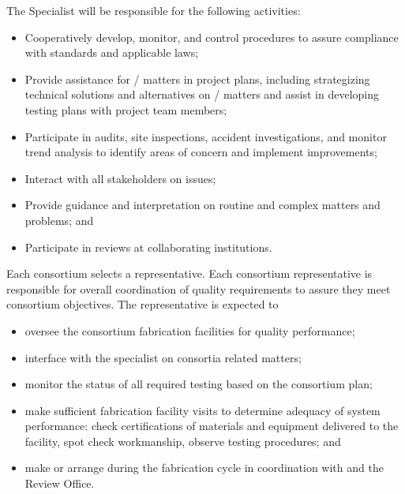 The   Specialist will be responsible for the
following activities:
\begin{itemize}
	\item Cooperatively develop, monitor, and control 
           procedures to assure compliance with 
          standards and applicable laws;
     \item Provide assistance for / matters in project
       plans, including strategizing technical solutions and
       alternatives on / matters and assist in developing
       testing plans with project team members;
	   \item Participate in audits, site inspections, accident
             investigations, and monitor trend analysis to identify
             areas of concern and implement improvements;
	\item Interact with all stakeholders on  issues;
      \item Provide guidance and interpretation on routine and complex
         matters and problems; and
	\item Participate in reviews at collaborating institutions.
\end{itemize}

Each consortium selects a  representative. %
Each consortium  representative is responsible for
overall coordination of quality requirements to assure they meet
consortium objectives.  The  representative is expected to %
\begin{itemize}
  \item oversee the consortium fabrication facilities for quality
    performance;
  \item interface with the   specialist on
    consortia  related matters;
  \item monitor the status of all required testing based on the
    consortium  plan;
  \item make sufficient fabrication facility visits to determine
    adequacy of  system performance: check certifications
    of materials and equipment delivered to the facility, spot check
    workmanship, observe testing procedures; and
  \item make or arrange  during the fabrication cycle in
    coordination with  and the  Review Office.
\end{itemize}

